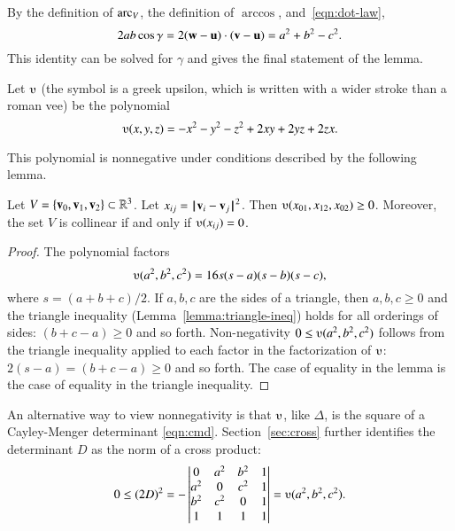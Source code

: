 \begin{proved}
By the definition of $\operatorname{arc}_V$, the
definition of $\arccos$, and~\eqref{eqn:dot-law},
\[ 
2 a b \cos \gamma = 2 ({\mathbf w} - {\mathbf u})\cdot ({\mathbf v} - {\mathbf u}) = a^2 + b^2 - c^2.
\] 
This identity can be solved for $\gamma$ and
 gives the final statement of the lemma.  \swallowed\end{proved}


\begin{definition}[$\ups$]\label{def:ups}
Let $\ups$ (the symbol is a greek upsilon, which is written with a
wider stroke than a roman vee) be the polynomial
\[ \ups(x,y,z) = -x^2 - y^2 - z^2 + 2 x y + 2 y z + 2
  z x.\] 
%
\end{definition}



This polynomial is nonnegative under conditions described by the
following lemma. 


\begin{lemma}[]\label{lemma:ups} Let
  $V=\{{\mathbf v}_0,{\mathbf v}_1,{\mathbf v}_2\}\subset\mathbb{R}^3$.  Let $x_{ij} =
  \norm{\v_i}{\v_j}^2$.  Then $\ups(x_{01},x_{12},x_{02})\ge 0$.
  Moreover, the set $V$ is collinear if and only if $\ups(x_{ij}) =
  0$.%
\end{lemma}

\begin{proof}
The polynomial factors
\begin{equation}\label{eqn:ups}
\ups(a^2,b^2,c^2) = 16 s (s-a) (s-b)
  (s-c),
\end{equation}
where $s = (a+b+c)/2$.  If $a,b,c$ are the sides of a triangle, then
$a,b,c\ge0$ and the triangle inequality (Lemma~\ref{lemma:triangle-ineq})
holds for all orderings of sides: $(b+c-a)\ge 0$ and so forth.
Non-negativity $0\le \ups(a^2,b^2,c^2)$ follows from the triangle
inequality applied to each factor in the factorization of $\ups$:
$2(s-a) = (b+c-a) \ge0$ and so forth.  The case of equality in the lemma is the
case of equality in the triangle inequality.
%
%
\end{proof}

An alternative way to view nonnegativity is
that $\ups$, like $\Delta$, is the square of a Cayley-Menger determinant
\eqref{eqn:cmd}.  Section~\ref{sec:cross}  further identifies
the determinant $D$ as the norm of a cross product:
\[
0\le (2D)^2 = -
\left|\begin{matrix} 0 & a^2 & b^2 & 1\\ a^2 & 0 & c^2 & 1\\  b^2 & c^2 & 0 & 1\\
1 & 1 & 1& 1
\end{matrix}\right| = \ups(a^2,b^2,c^2).
\]


